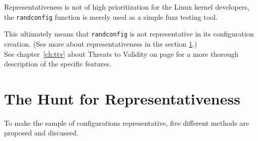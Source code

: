 \documentclass[a4paper,11pt]{report}
\begin{document}
Representativeness is not of high prioritization for the Linux kernel 
developers, the \texttt{randconfig} function is merely used as a simple fuzz 
testing tool.

This ultimately means that \texttt{randconfig} is not representative in its 
configuration creation. (See more about representativeness in the section 
\ref{rephunt}.)
\\


See chapter~\ref{ch:ttv} about Threats to Validity on page \pageref{ch:ttv} 
for a more thorough description of the specific features.

\fi  %




        \section{The Hunt for Representativeness}
        \label{rephunt}
To make the sample of configurations representative, five different methods are
proposed and discussed.
\end{document}
